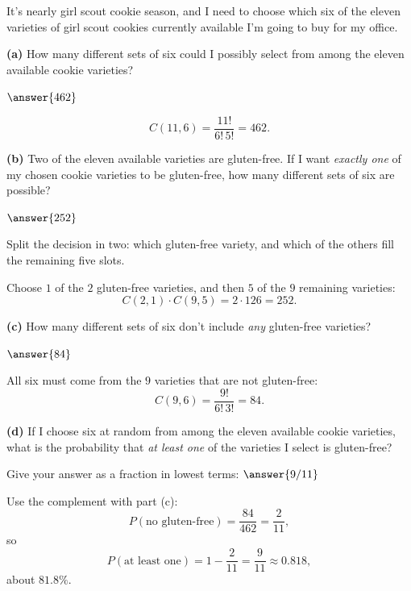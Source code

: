 \documentclass[12pt]{ximera}
\begin{document}
\begin{problem}
It's nearly girl scout cookie season, and I need to choose which six of the eleven
varieties of girl scout cookies currently available I'm going to buy for my office.

\begin{prompt}
\textbf{(a)} How many different sets of six could I possibly select from among the
eleven available cookie varieties?

$\answer{462}$

\begin{feedback}
\[ C(11,6)=\frac{11!}{6!\,5!}=462. \]
\end{feedback}
\end{prompt}

\begin{prompt}
\textbf{(b)} Two of the eleven available varieties are gluten-free. If I want
\emph{exactly one} of my chosen cookie varieties to be gluten-free, how many
different sets of six are possible?

$\answer{252}$

\begin{hint}
Split the decision in two: which gluten-free variety, and which of the others fill
the remaining five slots.
\end{hint}

\begin{feedback}
Choose $1$ of the $2$ gluten-free varieties, and then $5$ of the $9$ remaining
varieties:
\[
C(2,1)\cdot C(9,5) = 2\cdot 126 = 252.
\]
\end{feedback}
\end{prompt}

\begin{prompt}
\textbf{(c)} How many different sets of six don't include \emph{any} gluten-free
varieties?

$\answer{84}$

\begin{feedback}
All six must come from the $9$ varieties that are not gluten-free:
\[ C(9,6)=\frac{9!}{6!\,3!}=84. \]
\end{feedback}
\end{prompt}

\begin{prompt}
\textbf{(d)} If I choose six at random from among the eleven available cookie
varieties, what is the probability that \emph{at least one} of the varieties I select
is gluten-free?

Give your answer as a fraction in lowest terms: $\answer{9/11}$

\begin{feedback}
Use the complement with part (c):
\[
P(\text{no gluten-free}) = \frac{84}{462} = \frac{2}{11},
\]
so
\[
P(\text{at least one}) = 1-\frac{2}{11} = \frac{9}{11}\approx 0.818,
\]
about $81.8\%$.
\end{feedback}
\end{prompt}
\end{problem}
\end{document}
